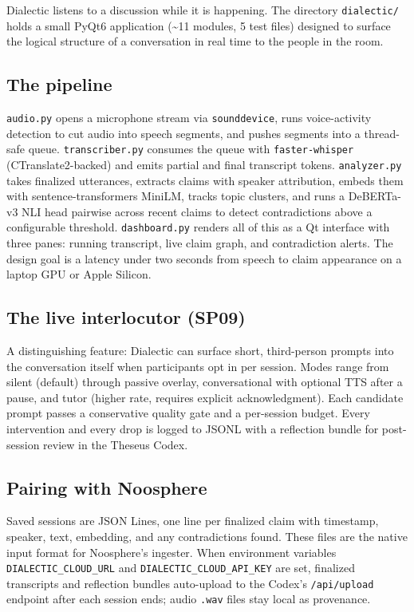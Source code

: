 \documentclass[11pt,letterpaper]{article}
\newcommand{\file}[1]{\texttt{#1}}
\begin{document}
Dialectic listens to a discussion while it is happening. The directory \file{dialectic/} holds a small PyQt6 application (\textasciitilde 11 modules, 5 test files) designed to surface the logical structure of a conversation in real time to the people in the room.

\subsection{The pipeline}

\file{audio.py} opens a microphone stream via \file{sounddevice}, runs voice-activity detection to cut audio into speech segments, and pushes segments into a thread-safe queue. \file{transcriber.py} consumes the queue with \file{faster-whisper} (CTranslate2-backed) and emits partial and final transcript tokens. \file{analyzer.py} takes finalized utterances, extracts claims with speaker attribution, embeds them with sentence-transformers MiniLM, tracks topic clusters, and runs a DeBERTa-v3 NLI head pairwise across recent claims to detect contradictions above a configurable threshold. \file{dashboard.py} renders all of this as a Qt interface with three panes: running transcript, live claim graph, and contradiction alerts. The design goal is a latency under two seconds from speech to claim appearance on a laptop GPU or Apple Silicon.

\subsection{The live interlocutor (SP09)}

A distinguishing feature: Dialectic can surface short, third-person prompts into the conversation itself when participants opt in per session. Modes range from silent (default) through passive overlay, conversational with optional TTS after a pause, and tutor (higher rate, requires explicit acknowledgment). Each candidate prompt passes a conservative quality gate and a per-session budget. Every intervention and every drop is logged to JSONL with a reflection bundle for post-session review in the Theseus Codex.

\subsection{Pairing with Noosphere}

Saved sessions are JSON Lines, one line per finalized claim with timestamp, speaker, text, embedding, and any contradictions found. These files are the native input format for Noosphere's ingester. When environment variables \texttt{DIALECTIC\_CLOUD\_URL} and \texttt{DIALECTIC\_CLOUD\_API\_KEY} are set, finalized transcripts and reflection bundles auto-upload to the Codex's \file{/api/upload} endpoint after each session ends; audio \file{.wav} files stay local as provenance.
\end{document}
